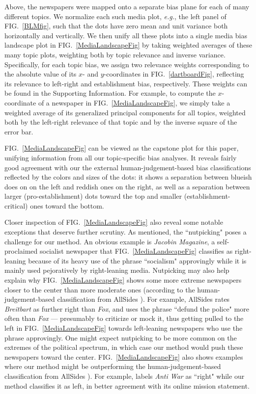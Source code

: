 \documentclass[10pt,letterpaper]{article}
\def\eg{{\frenchspacing\it e.g.}}
\def\fig#1{FIG.~\ref{#1}}
\def\Fig#1{FIG.~\ref{#1}}
\begin{document}
 
Above, the newspapers were mapped onto a separate bias plane for each of many different topics. 
We normalize each such media plot, \eg, the left panel of \fig{BLMfig}, such that the dots have zero mean and unit variance both horizontally and vertically. 
We then unify all these plots into a single media bias landscape plot in \fig{MediaLandscapeFig} by taking weighted averages of these many topic plots, weighting both by topic relevance and inverse variance.
Specifically,  for each topic bias, we assign two relevance weights corresponding to the absolute value of its $x$- and $y$-coordinates in \fig{dartboardFig}, reflecting its relevance to left-right and establishment bias, respectively. These weights can be found in the Supporting Information.
For example, to compute the $x$-coordinate of a newspaper in \fig{MediaLandscapeFig}, we
simply take a weighted average of its generalized principal components for all topics, weighted both by the left-right relevance of that topic and by the inverse square of the error bar.
 


\Fig{MediaLandscapeFig} can be viewed as the capstone plot for this paper, unifying  information from all our topic-specific bias analyses.
It reveals fairly good agreement with our the external human-judgement-based bias classifications reflected by the colors and sizes of the dots: it shows a separation between blueish does on on the left and reddish ones on the right, as well as a separation between larger (pro-establishment) dots toward the top and smaller (establishment-critical) ones toward the bottom.

Closer inspection of \fig{MediaLandscapeFig} also reveal some notable exceptions that deserve further scrutiny.
As mentioned, the ``nutpicking" poses a challenge for our method. An obvious example is {\it Jacobin Magazine}, a self-proclaimed socialist newspaper \cite{jacobin} that \fig{MediaLandscapeFig} classifies as right-leaning because of its heavy use of the phrase ``socialism" approvingly while it is mainly used pejoratively by right-leaning media.
Nutpicking may also help explain why 
\fig{MediaLandscapeFig} shows some more extreme newspapers closer to the center than more moderate ones (according to the human-judgement-based classification from AllSides \cite{noauthor_allsides_nodate}).
For example, AllSides rates {\it Breitbart} as further right than {\it Fox}, and uses the phrase ``defund the police" more often than {\it Fox} --- presumably to criticize or mock it, thus getting pulled to the left in \fig{MediaLandscapeFig} towards left-leaning newspapers who use the phrase approvingly.
One might expect nutpicking to be more common on the extremes of the political spectrum, in which case our method would push these newspapers toward the center.
\fig{MediaLandscapeFig} also shows examples where our method might be outperforming the human-judgement-based classification from AllSides \cite{noauthor_allsides_nodate}). For example, 
\cite{noauthor_allsides_nodate} labels 
{\it Anti War} as ``right" while our method classifies it as left, in better agreement with its online mission statement. 
\end{document}
